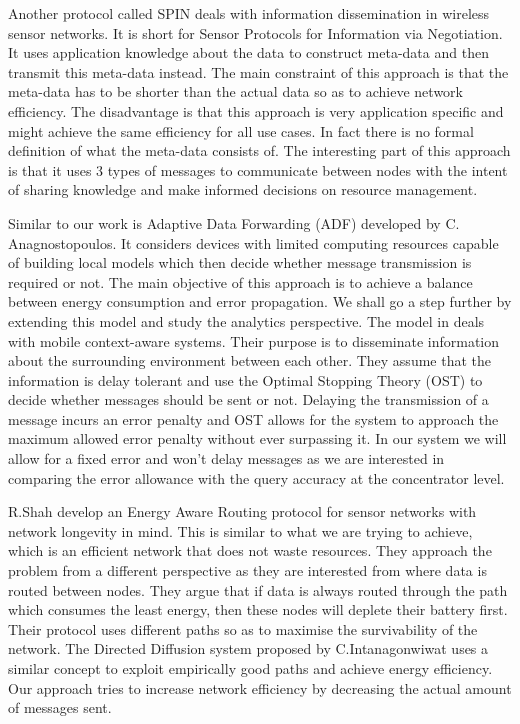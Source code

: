 \documentclass{mproj}
\begin{document}
Another protocol called SPIN \cite{adaptiveProtocols} deals with information dissemination in wireless sensor networks. It is short for Sensor Protocols for Information via Negotiation. It uses application knowledge about the data to construct meta-data and then transmit this meta-data instead. The main constraint of this approach is that the meta-data has to be shorter than the actual data so as to achieve network efficiency. The disadvantage is that this approach is very application specific and might achieve the same efficiency for all use cases. In fact there is no formal definition of what the meta-data consists of. The interesting part of this approach is that it uses 3 types of messages to communicate between nodes with the intent of sharing knowledge and make informed decisions on resource management.

Similar to our work is Adaptive Data Forwarding (ADF) \cite{adaptiveDataForwarding} developed by C. Anagnostopoulos. It considers devices with limited computing resources capable of building local models which then decide whether message transmission is required or not. The main objective of this approach is to achieve a balance between energy consumption and error propagation. We shall go a step further by extending this model and study the analytics perspective. The model in \cite{timeOptimizedContextual} deals with mobile context-aware systems. Their purpose is to disseminate information about the surrounding environment between each other. They assume that the information is delay tolerant and use the Optimal Stopping Theory (OST) to decide whether messages should be sent or not. Delaying the transmission of a message incurs an error penalty and OST allows for the system to approach the maximum allowed error penalty without ever surpassing it. In our system we will allow for a fixed error and won't delay messages as we are interested in comparing the error allowance with the query accuracy at the concentrator level.

R.Shah develop an Energy Aware Routing protocol \cite{energyAwareRouting} for sensor networks with network longevity in mind. This is similar to what we are trying to achieve, which is an efficient network that does not waste resources. They approach the problem from a different perspective as they are interested from where data is routed between nodes. They argue that if data is always routed through the path which consumes the least energy, then these nodes will deplete their battery first. Their protocol uses different paths so as to maximise the survivability of the network. The Directed Diffusion \cite{directedDiffusion} system proposed by C.Intanagonwiwat uses a similar concept to exploit empirically good paths and achieve energy efficiency. Our approach tries to increase network efficiency by decreasing the actual amount of messages sent.
\end{document}
